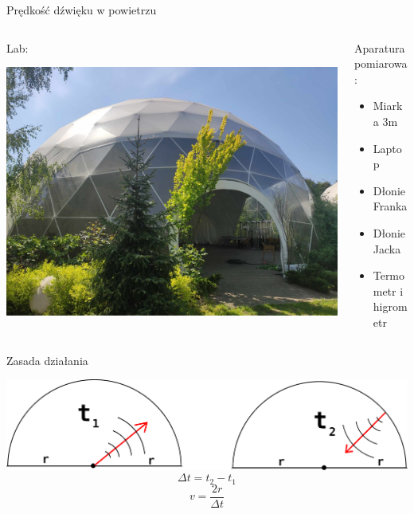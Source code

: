 \documentclass{beamer}
\begin{document}
\begin{frame}{Prędkość dźwięku w powietrzu}

	\begin{columns}
		\begin{column}{0.5\textwidth}
			Lab:

			\includegraphics[width=\linewidth]{lab_KlaKop.jpg}
		\end{column}
		\begin{column}{0.5\textwidth}
			Aparatura pomiarowa:
			\begin{itemize}
				\item Miarka 3m
				\item Laptop
				\item Dłonie Franka
				\item Dłonie Jacka
				\item Termometr i higrometr
			\end{itemize}
		\end{column}
	\end{columns}

\end{frame}

\begin{frame}{Zasada działania}

	\includegraphics[width=\linewidth]{wave.png}
	$$\Delta t=t_2-t_1$$
	$$v=\frac{2r}{\Delta t}$$

\end{frame}
\end{document}
